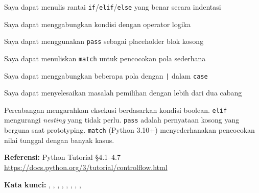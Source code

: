 ﻿\documentclass[../main.tex]{subfiles}
\begin{document}
\begin{checklist}
  \item Saya dapat menulis rantai \texttt{if}/\texttt{elif}/\texttt{else} yang benar secara indentasi
  \item Saya dapat menggabungkan kondisi dengan operator logika
  \item Saya dapat menggunakan \texttt{pass} sebagai placeholder blok kosong
  \item Saya dapat menuliskan \texttt{match} untuk pencocokan pola sederhana
  \item Saya dapat menggabungkan beberapa pola dengan \texttt{|} dalam \texttt{case}
  \item Saya dapat menyelesaikan masalah pemilihan dengan lebih dari dua cabang
\end{checklist}

\begin{rangkuman}
Percabangan mengarahkan eksekusi berdasarkan kondisi boolean. \texttt{elif} mengurangi \textit{nesting} yang tidak perlu. \texttt{pass} adalah pernyataan kosong yang berguna saat prototyping. \texttt{match} (Python 3.10+) menyederhanakan pencocokan nilai tunggal dengan banyak kasus.

\textbf{Referensi:} {\small Python Tutorial §4.1--4.7 \url{https://docs.python.org/3/tutorial/controlflow.html}}

\textbf{Kata kunci:} , , , , , , , , 
\end{rangkuman}
\end{document}

